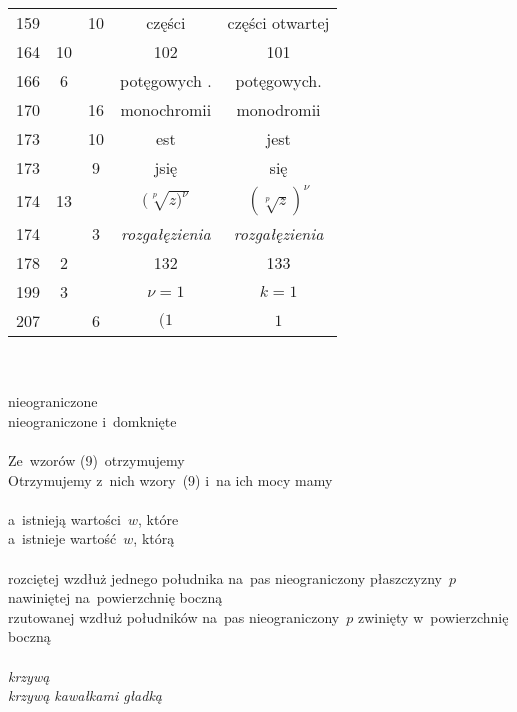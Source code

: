 \documentclass[a4paper,11pt]{article}
\begin{document}
\begin{center}
\begin{tabular}{|c|c|c|c|c|}
    159 & & 10 & części & części otwartej \\
    164 & 10 & & 102 & 101 \\
    166 &  6 & & potęgowych . & potęgowych. \\
    170 & & 16 & monochromii & monodromii \\
    173 & & 10 & est & jest \\
    173 & &  9 & jsię & się \\
    174 & 13 & & $( \sqrt[p]{ z )^{ \nu } }$ & $( \sqrt[p]{ z } )^{ \nu }$ \\
    174 & &  3 & \emph{rozgałęzienia} & \emph{rozgałęzienia} \\
    178 &  2 & & 132 & 133 \\
    199 &  3 & & $\nu = 1 $ & $k = 1$ \\
    207 & &  6 & $( 1$ & $1$ \\
    \hline
  \end{tabular}

\end{center}
\noi \\
 \\
\Jest nieograniczone \\
\Pow  nieograniczone i~domknięte \\
 \\
\Jest Ze~wzorów (9)~otrzymujemy \\
\Pow  Otrzymujemy z~nich wzory~(9) i~na ich mocy mamy \\
 \\
\Jest a~istnieją wartości~$w$, które \\
\Pow  a~istnieje wartość~$w$, którą \\
 \\
\Jest rozciętej wzdłuż jednego południka na~pas nieograniczony
płaszczyzny~$p$ nawiniętej na~powierzchnię boczną \\
\Pow rzutowanej wzdłuż południków na~pas nieograniczony~$p$ zwinięty
w~powierzchnię boczną \\
 \\
\Jest \emph{krzywą} \\
\Pow  \emph{krzywą kawałkami gładką} \\
 \\
\end{document}
